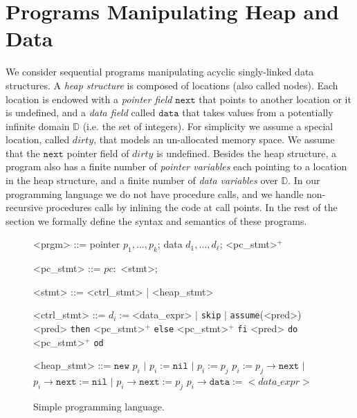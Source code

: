 \documentclass{llncs}
\newcommand{\next}{\texttt{next}}
\newcommand{\dom}{\mathbb{D}}
\newcommand{\data}{\texttt{data}}
\newcommand{\nil}{{\texttt{nil}}}
\newcommand{\dirty}{\mathit{dirty}}
\begin{document}
\section{Programs Manipulating Heap and Data}


We consider sequential programs manipulating acyclic singly-linked data structures. A {\em heap structure} is composed of locations (also called nodes). Each location is endowed  with a {\em pointer field} $\next$ that points to another location or it is undefined,  and a {\em data field} called $\data$ that takes values from a potentially infinite domain $\dom$ (i.e. the set of integers). For simplicity we assume a special location, called $\dirty$, that models an un-allocated memory space. We assume that the $\next$ pointer field of $\dirty$ is undefined. Besides the heap structure, a program also has a finite number of {\em pointer variables} each pointing to a location in the heap structure, and a finite number of {\em data variables} over $\dom$. In our programming language  we do not have procedure calls, and we handle non-recursive procedures calls by inlining the code at call points. In the rest of the section we formally define the syntax and semantics of these programs.



\begin{wrapfigure}[9]{r}[20pt]{83mm}
\vspace{-1.2cm}
  \centering
\scriptsize
  \begin{grammar}
    <prgm> ::=  pointer $p_1,\ldots,p_k$; data $d_1,\ldots,d_\ell$;  <pc\_stmt>$^+$
\vspace{-0.2cm}


    <pc\_stmt> ::= $pc:$ <stmt>;
\vspace{-0.2cm}

      <stmt> ::= <ctrl\_stmt> | <heap\_stmt>
\vspace{-0.2cm}



     <ctrl\_stmt> ::= $d_i:=$<data\_expr> $\mid$ {\tt skip}
 $\mid$ {\tt assume}(<pred>)  <pred> {\tt then} <pc\_stmt>$^+$ {\tt else} <pc\_stmt>$^+$ {\tt fi}
 <pred> {\tt do} <pc\_stmt>$^+$ {\tt od}

\vspace{-0.2cm}


     <heap\_stmt> ::= \mbox{$\texttt{new } p_i$} $\mid$ \mbox{$p_i := \nil$}  $\mid$  \mbox{$p_i := p_j$} \alt \mbox{$p_i := p_j\rightarrow\next$} $\mid$ \mbox{$p_i\rightarrow\next := \nil$} $\mid$ \mbox{$p_i\rightarrow\next := p_j$} \alt $p_i\rightarrow\data :=<data\_expr>$

\end{grammar}
\vspace{-0.5cm}

\caption{Simple programming language.}
\label{grammar}
\end{wrapfigure}
\end{document}
